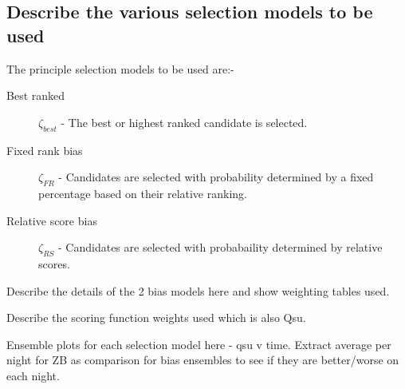 \subsection{Describe the various selection models to be used}

The principle selection models to be used are:-

\begin{description}
\item [Best ranked] $\zeta_{best}$ - The best or highest ranked candidate is selected.
\item [Fixed rank bias] $\zeta_{FR}$ - Candidates are selected with probability determined by a fixed percentage based on their relative ranking.
\item [Relative score bias] $\zeta_{RS}$ - Candidates are selected with probabaility determined by relative scores.
\end{description}

Describe the details of the 2 bias models here and show weighting tables used.

Describe the scoring function weights used which is also Qsu.

Ensemble plots for each selection model here - qsu v time. Extract average per night for ZB as comparison for bias ensembles to see if they are better/worse on each night.

